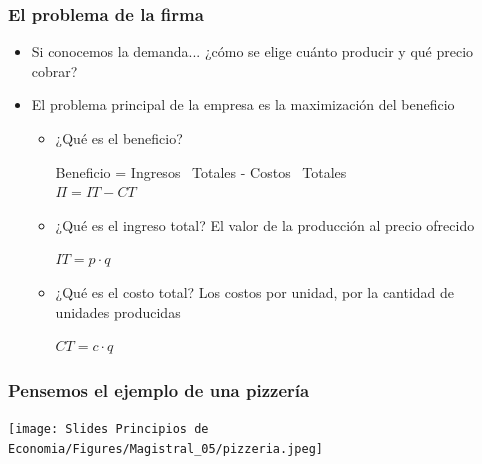 \documentclass{beamer}
\begin{document}
\begin{frame}
\frametitle{El problema de la firma}
\begin{itemize}
    \item Si conocemos la demanda... ¿cómo se elige cuánto producir y qué precio cobrar?
    \vspace{2mm}
    \item El problema principal de la empresa es la maximización del beneficio \vspace{2mm} 
        \begin{itemize}
        \item ¿Qué es el beneficio? \vspace{2mm}  
            \begin{center}
            Beneficio = Ingresos \ Totales - Costos \ Totales \\  \vspace{2mm}
            $\Pi = IT - CT $ 
            \end{center}
         \vspace{2mm}
        \item ¿Qué es el ingreso total?  
        El valor de la producción al precio ofrecido \\ \vspace{1mm} 
            \begin{center}
            $IT = p \cdot q$
            \end{center}
        \vspace{2mm}
        \item ¿Qué es el costo total?
        Los costos por unidad, por la cantidad de unidades producidas \\ \vspace{1mm} 
            \begin{center}
            $CT = c \cdot q$
            \end{center}
    \end{itemize} 
\end{itemize} 
\end{frame}

\begin{frame}
\frametitle{Pensemos el ejemplo de una pizzería}
\centering
\texttt{[image: Slides Principios de Economia/Figures/Magistral\_05/pizzeria.jpeg]}
\end{frame}
\end{document}
